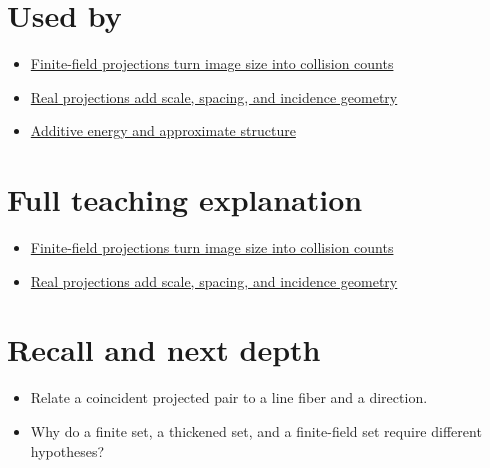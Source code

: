 \section{Used by}\label{appendix-3c73f7862157-used-by}

\begin{itemize}
\tightlist
\item
  \href{Continuous\%20Notes/University\%20-\%20Worlds,\%20Images\%20and\%20Inference\%20-\%20Graphics,\%20Vision\%20and\%20Photography\#Finite-field\%20projections\%20turn\%20image\%20size\%20into\%20collision\%20counts}{Finite-field projections turn image size into collision counts}
\item
  \href{Continuous\%20Notes/University\%20-\%20Worlds,\%20Images\%20and\%20Inference\%20-\%20Graphics,\%20Vision\%20and\%20Photography\#Real\%20projections\%20add\%20scale,\%20spacing,\%20and\%20incidence\%20geometry}{Real projections add scale, spacing, and incidence geometry}
\item
  \hyperref[appendix-b0732b22e7d6]{Additive energy and approximate structure}
\end{itemize}

\section{Full teaching explanation}\label{appendix-3c73f7862157-full-teaching-explanation}

\begin{itemize}
\tightlist
\item
  \href{Continuous\%20Notes/University\%20-\%20Worlds,\%20Images\%20and\%20Inference\%20-\%20Graphics,\%20Vision\%20and\%20Photography\#Finite-field\%20projections\%20turn\%20image\%20size\%20into\%20collision\%20counts}{Finite-field projections turn image size into collision counts}
\item
  \href{Continuous\%20Notes/University\%20-\%20Worlds,\%20Images\%20and\%20Inference\%20-\%20Graphics,\%20Vision\%20and\%20Photography\#Real\%20projections\%20add\%20scale,\%20spacing,\%20and\%20incidence\%20geometry}{Real projections add scale, spacing, and incidence geometry}
\end{itemize}

\section{Recall and next depth}\label{appendix-3c73f7862157-recall-and-next-depth}

\begin{itemize}
\tightlist
\item
  Relate a coincident projected pair to a line fiber and a direction.
\item
  Why do a finite set, a thickened set, and a finite-field set require different hypotheses?
\end{itemize}

